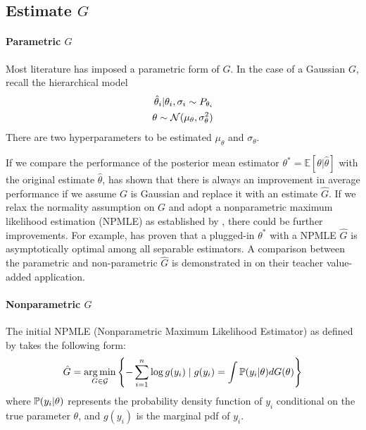 \documentclass[12pt]{article}
\begin{document}
\subsection{Estimate $G$}

\paragraph{Parametric $G$}

Most literature has imposed a parametric form of $G$. In the case of a Gaussian
$G$, recall the hierarchical model
\begin{align*}
    \hat{\theta}_i|\theta_i, \sigma_i \sim P_{\theta_i} \\
    \theta\sim \mathcal{N}(\mu_\theta,\sigma^2_\theta)
\end{align*}
There are two hyperparameters to be estimated $\mu_\theta$ and $\sigma_\theta$.

If we compare the performance of the posterior mean estimator \( \theta^* =
\mathbb{E}[\theta | \hat{\theta}] \) with the original estimate \( \hat{\theta}
\), \citet{james1992estimation} has shown that there is always an improvement
in average performance if we assume \( G \) is Gaussian and replace it with an
estimate \( \hat{G} \). If we relax the normality assumption on \( G \) and
adopt a nonparametric maximum likelihood estimation (NPMLE) as established by
\citet{kiefer1956consistency}, there could be further improvements. For
example, \citet{jiang2009general} has proven that a plugged-in \( \theta^* \)
with a NPMLE \( \hat{G} \) is asymptotically optimal among all separable
estimators. A comparison between the parametric and non-parametric \( \hat{G}
\) is demonstrated in \citet{gilraine2020new} on their teacher value-added
application.

\paragraph{Nonparametric $G$}

The initial NPMLE (Nonparametric Maximum Likelihood Estimator) as defined by
\citet{kiefer1956consistency} takes the following form:
\begin{equation*}
    \hat{G} = \operatorname*{arg\,min}_{G \in \mathcal{G}} \left\{-\sum_{i=1}^{n}\log g(y_i) \mid g(y_i) = \int \mathbb{P}(y_i |\theta) dG(\theta) \right\}
\end{equation*}
where \( \mathbb{P}(y_i |\theta) \) represents the probability density function of \( y_i \) conditional on the true parameter \( \theta \), and \( g(y_i) \) is the marginal pdf of \( y_i \).
\end{document}
